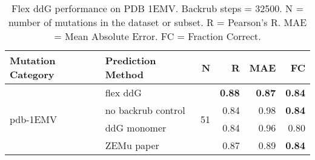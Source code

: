 \begin{table}
  \begin{tabular}{llrrrr}
\toprule
Mutation Category &   Prediction Method &   N &    R &  MAE &   FC \\
\midrule
 \multirow{ 4}{*}{pdb-1EMV} & flex ddG & \multirow{ 4}{*}{51} & \textbf{0.88} & \textbf{0.87} & \textbf{0.84}  \\
 & no backrub control & & 0.84 & 0.98 & \textbf{0.84}  \\
 & ddG monomer & & 0.84 & 0.96 & 0.80  \\
 & ZEMu paper & & 0.87 & 0.89 & \textbf{0.84}  \\
\bottomrule
\end{tabular}
  \caption[Flex ddG performance on PDB 1EMV]{
    Flex ddG performance on PDB 1EMV. Backrub steps = 32500. N = number of mutations in the dataset or subset. R = Pearson's R. MAE = Mean Absolute Error. FC = Fraction Correct.
  } \label{tab:table-pdb-1EMV}
\end{table}
